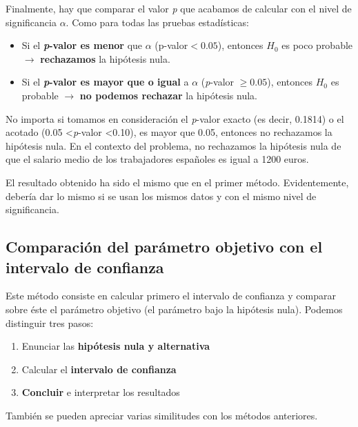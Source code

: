 \documentclass[
]{book}
\providecommand{\tightlist}{%
  \setlength{\itemsep}{0pt}\setlength{\parskip}{0pt}}
\begin{document}
Finalmente, hay que comparar el valor \emph{p} que acabamos de calcular con el nivel de significancia \(\alpha\). Como para todas las pruebas estadísticas:

\begin{itemize}
\tightlist
\item
  Si el \textbf{\emph{p}-valor es menor} que \(\alpha\) (p-valor\(<0.05\)), entonces \(H_0\) es poco probable \(\rightarrow\) \textbf{rechazamos} la hipótesis nula.
\item
  Si el \textbf{\emph{p}-valor es mayor que o igual} a \(\alpha\) (\emph{p}-valor \(\ge 0.05\)), entonces \(H_0\) es probable \(\rightarrow\) \textbf{no podemos rechazar} la hipótesis nula.
\end{itemize}

No importa si tomamos en consideración el \emph{p}-valor exacto (es decir, 0.1814) o el acotado (0.05 \textless{}\emph{p}-valor \textless0.10), es mayor que 0.05, entonces no rechazamos la hipótesis nula. En el contexto del problema, no rechazamos la hipótesis nula de que el salario medio de los trabajadores españoles es igual a 1200 euros.

El resultado obtenido ha sido el mismo que en el primer método. Evidentemente, debería dar lo mismo si se usan los mismos datos y con el mismo nivel de significancia.

\hypertarget{comparaciuxf3n-del-paruxe1metro-objetivo-con-el-intervalo-de-confianza}{%
\subsection{Comparación del parámetro objetivo con el intervalo de confianza}\label{comparaciuxf3n-del-paruxe1metro-objetivo-con-el-intervalo-de-confianza}}

Este método consiste en calcular primero el intervalo de confianza y comparar sobre éste el parámetro objetivo (el parámetro bajo la hipótesis nula). Podemos distinguir tres pasos:

\begin{enumerate}
\def\labelenumi{\arabic{enumi}.}
\tightlist
\item
  Enunciar las \textbf{hipótesis nula y alternativa}
\item
  Calcular el \textbf{intervalo de confianza}
\item
  \textbf{Concluir} e interpretar los resultados
\end{enumerate}

También se pueden apreciar varias similitudes con los métodos anteriores.
\end{document}
